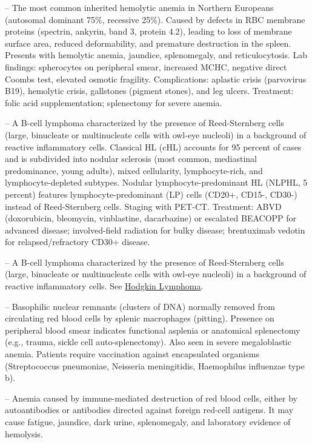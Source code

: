 -- The most common inherited hemolytic anemia in Northern Europeans (autosomal dominant 75\%, recessive 25\%). Caused by defects in RBC membrane proteins (spectrin, ankyrin, band 3, protein 4.2), leading to loss of membrane surface area, reduced deformability, and premature destruction in the spleen. Presents with hemolytic anemia, jaundice, splenomegaly, and reticulocytosis. Lab findings: spherocytes on peripheral smear, increased MCHC, negative direct Coombs test, elevated osmotic fragility. Complications: aplastic crisis (parvovirus B19), hemolytic crisis, gallstones (pigment stones), and leg ulcers. Treatment: folic acid supplementation; splenectomy for severe anemia.

-- A B-cell lymphoma characterized by the presence of Reed-Sternberg cells (large, binucleate or multinucleate cells with owl-eye nucleoli) in a background of reactive inflammatory cells. Classical HL (cHL) accounts for 95 percent of cases and is subdivided into nodular sclerosis (most common, mediastinal predominance, young adults), mixed cellularity, lymphocyte-rich, and lymphocyte-depleted subtypes. Nodular lymphocyte-predominant HL (NLPHL, 5 percent) features lymphocyte-predominant (LP) cells (CD20+, CD15-, CD30-) instead of Reed-Sternberg cells. Staging with PET-CT. Treatment: ABVD (doxorubicin, bleomycin, vinblastine, dacarbazine) or escalated BEACOPP for advanced disease; involved-field radiation for bulky disease; brentuximab vedotin for relapsed/refractory CD30+ disease.

-- A B-cell lymphoma characterized by the presence of Reed-Sternberg cells (large, binucleate or multinucleate cells with owl-eye nucleoli) in a background of reactive inflammatory cells. See \hyperlink{Hodgkin Lymphoma}{Hodgkin Lymphoma}.

-- Basophilic nuclear remnants (clusters of DNA) normally removed from circulating red blood cells by splenic macrophages (pitting). Presence on peripheral blood smear indicates functional asplenia or anatomical splenectomy (e.g., trauma, sickle cell auto-splenectomy). Also seen in severe megaloblastic anemia. Patients require vaccination against encapsulated organisms (Streptococcus pneumoniae, Neisseria meningitidis, Haemophilus influenzae type b).

-- Anemia caused by immune-mediated destruction of red blood cells, either by autoantibodies or antibodies directed against foreign red-cell antigens. It may cause fatigue, jaundice, dark urine, splenomegaly, and laboratory evidence of hemolysis.

